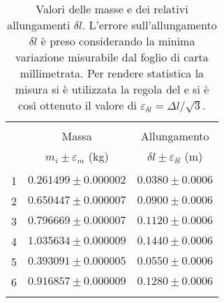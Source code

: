 \begin{table}[t]
  \centering
  \footnotesize
  \caption{Valori delle masse e dei relativi allungamenti $\delta l$. L'errore sull'allungamento $\delta l$ è 
  preso considerando la minima variazione misurabile dal foglio di carta millimetrata. Per rendere statistica 
  la misura si è utilizzata la regola del \treSigma e si è così ottenuto il valore di 
  $\varepsilon_{\delta l} = \Delta l / \sqrt{3}$.}
  \label{table:sts_values}
  \begin{tabular}{lcc}
      \hline\hline\\[-1.5ex]
        & Massa                      & Allungamento                            \\[+0.5ex]
        & $m_i\pm\varepsilon_m$ (kg) & $\delta l\pm\varepsilon_{\delta l}$ (m) \\[+0.5ex] \hline \\[-1.5ex]
      1 & $0.261499\pm0.000002$      & $0.0380\pm0.0006$                       \\[+0.5ex]
      2 & $0.650447\pm0.000007$      & $0.0900\pm0.0006$                       \\[+0.5ex]
      3 & $0.796669\pm0.000007$      & $0.1120\pm0.0006$                       \\[+0.5ex]
      4 & $1.035634\pm0.000009$      & $0.1440\pm0.0006$                       \\[+0.5ex]
      5 & $0.393091\pm0.000005$      & $0.0550\pm0.0006$                       \\[+0.5ex]
      6 & $0.916857\pm0.000009$      & $0.1280\pm0.0006$                       \\[+0.5ex]
      \hline \\[-1.5ex]
  \end{tabular}
\end{table}

